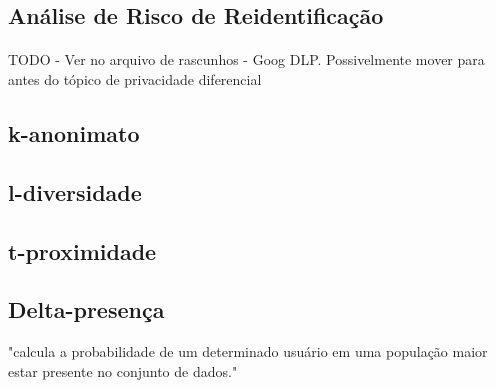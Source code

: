 \subsection{Análise de Risco de Reidentificação}

\paragraph{} TODO - Ver no arquivo de rascunhos - Goog DLP. Possivelmente mover para antes do tópico de privacidade diferencial

\subsection{k-anonimato}

\subsection{l-diversidade}

\subsection{t-proximidade}

\subsection{Delta-presença}
"calcula a probabilidade de um determinado usuário em uma população maior estar presente no conjunto de dados."







